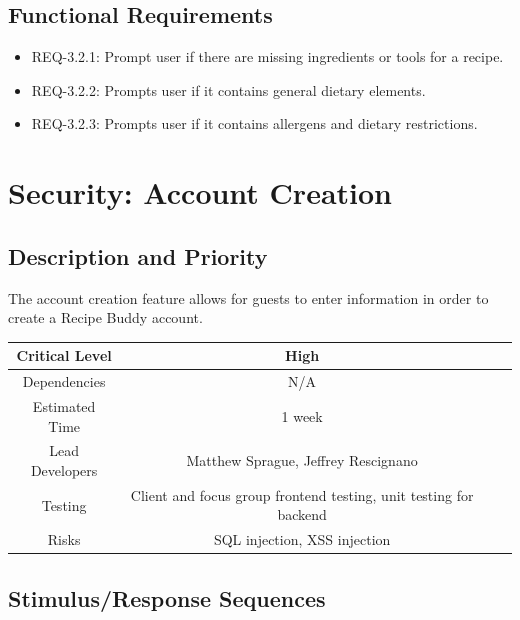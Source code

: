 \documentclass{scrreprt}
\begin{document}
\subsection{Functional Requirements}

\begin{itemize}
    \item REQ-3.2.1: Prompt user if there are missing ingredients or tools for a recipe.
    \item REQ-3.2.2: Prompts user if it contains general dietary elements.
    \item REQ-3.2.3: Prompts user if it contains allergens and dietary restrictions.
\end{itemize}

\section{Security: Account Creation}

\subsection{Description and Priority}

The account creation feature allows for guests to enter information in order to create a \gls{Recipe Buddy} account.

\begin{center}
    \begin{tabular}{| c | c | c | c |}
        \hline
        Critical Level  & High                                                              \\
        \hline
        Dependencies    & N/A                                                               \\
        \hline
        Estimated Time  & 1 week                                                            \\
        \hline
        Lead Developers & Matthew Sprague, Jeffrey Rescignano                               \\
        \hline
        Testing         & Client and focus group frontend testing, unit testing for backend \\
        \hline
        Risks           & \gls{SQL injection}, \gls{XSS injection}                          \\
        \hline
    \end{tabular}
\end{center}

\subsection{Stimulus/Response Sequences}
\end{document}
